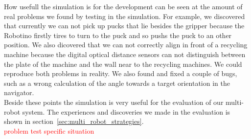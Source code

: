 How usefull the simulation is for the development can be seen at the amount of real problems we found by testing in the simulation. For example, we discovered that currently we can not pick up pucks that lie besides the gripper because the Robotino firstly tires to turn to the puck and so pushs the puck to an other position. We also dicovered that we can not correctly align in front of a recycling machine because the digital optical distance sensors can not distinguish between the plate of the machine and the wall near to the recycling machines. We could reproduce both problems in reality. We also found and fixed a couple of bugs, such as a wrong calculation of the angle towards a target orientation in the navigator.\\
Beside these points the simulation is very useful for the evaluation of our multi-robot system. The experiences and discoveries we made in the evaluation is shown in section~\ref{sec:multi_robot_strategies}.\\
\textcolor{red}{problem test specific situation}

